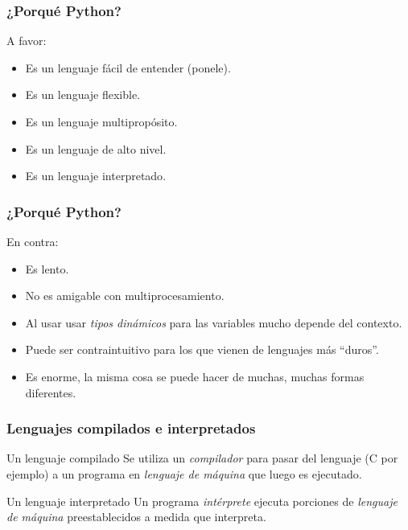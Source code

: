 \documentclass[aspectratio=169]{beamer}
\begin{document}

\begin{frame}
\frametitle{¿Porqué Python?}

A favor:
\begin{itemize}
\item Es un lenguaje \alert{fácil de entender} (ponele).
\item Es un lenguaje \alert{flexible}.
\item Es un lenguaje \alert{multipropósito}.
\item Es un lenguaje \alert{de alto nivel}.
\item Es un lenguaje \alert{interpretado}.
\end{itemize}

\end{frame}


\begin{frame}
\frametitle{¿Porqué Python?}

En contra:
\begin{itemize}
\item Es \alert{lento}.
\item No es amigable con \alert{multiprocesamiento}.
\item Al usar usar {\em tipos dinámicos} para las variables mucho depende del contexto.
\item Puede ser contraintuitivo para los que vienen de lenguajes más ``duros''.
\item Es \alert{enorme}, la misma cosa se puede hacer de \alert{muchas, muchas} formas diferentes.
\end{itemize}
\end{frame}


\begin{frame}
\frametitle{Lenguajes compilados e interpretados}
\begin{block}{Un lenguaje compilado}
Se utiliza un {\em compilador} para pasar del lenguaje (C por ejemplo) a un programa en {\em lenguaje de máquina} que luego es ejecutado.
\end{block}
\vspace{0.5cm}
\begin{block}{Un lenguaje interpretado}
Un programa {\em intérprete} ejecuta porciones de {\em lenguaje de máquina} \alert{preestablecidos} a medida que interpreta.
\end{block}
\end{frame}
\end{document}
